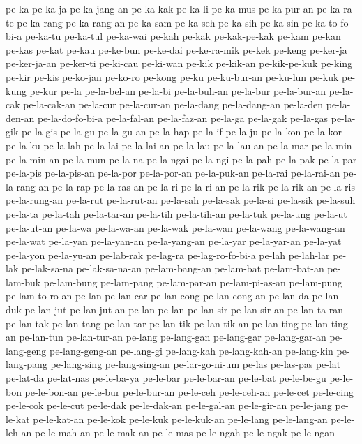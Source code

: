 {pe-ka pe-ka-ja pe-ka-jang-an pe-ka-kak pe-ka-li pe-ka-mus pe-ka-pur-an
pe-ka-ra-te pe-ka-rang pe-ka-rang-an pe-ka-sam pe-ka-seh pe-ka-sih
pe-ka-sin pe-ka-to-fo-bi-a pe-ka-tu pe-ka-tul pe-ka-wai pe-kah pe-kak
pe-kak-pe-kak pe-kam pe-kan pe-kas pe-kat pe-kau pe-ke-bun pe-ke-dai
pe-ke-ra-mik pe-kek pe-keng pe-ker-ja pe-ker-ja-an pe-ker-ti pe-ki-cau
pe-ki-wan pe-kik pe-kik-an pe-kik-pe-kuk pe-king pe-kir pe-kis pe-ko-jan
pe-ko-ro pe-kong pe-ku pe-ku-bur-an pe-ku-lun pe-kuk pe-kung pe-kur pe-la
pe-la-bel-an pe-la-bi pe-la-buh-an pe-la-bur pe-la-bur-an pe-la-cak
pe-la-cak-an pe-la-cur pe-la-cur-an pe-la-dang pe-la-dang-an pe-la-den
pe-la-den-an pe-la-do-fo-bi-a pe-la-fal-an pe-la-faz-an pe-la-ga pe-la-gak
pe-la-gas pe-la-gik pe-la-gis pe-la-gu pe-la-gu-an pe-la-hap pe-la-if
pe-la-ju pe-la-kon pe-la-kor pe-la-ku pe-la-lah pe-la-lai pe-la-lai-an
pe-la-lau pe-la-lau-an pe-la-mar pe-la-min pe-la-min-an pe-la-mun pe-la-na
pe-la-ngai pe-la-ngi pe-la-pah pe-la-pak pe-la-par pe-la-pis pe-la-pis-an
pe-la-por pe-la-por-an pe-la-puk-an pe-la-rai pe-la-rai-an pe-la-rang-an
pe-la-rap pe-la-ras-an pe-la-ri pe-la-ri-an pe-la-rik pe-la-rik-an
pe-la-ris pe-la-rung-an pe-la-rut pe-la-rut-an pe-la-sah pe-la-sak
pe-la-si pe-la-sik pe-la-suh pe-la-ta pe-la-tah pe-la-tar-an pe-la-tih
pe-la-tih-an pe-la-tuk pe-la-ung pe-la-ut pe-la-ut-an pe-la-wa pe-la-wa-an
pe-la-wak pe-la-wan pe-la-wang pe-la-wang-an pe-la-wat pe-la-yan
pe-la-yan-an pe-la-yang-an pe-la-yar pe-la-yar-an pe-la-yat pe-la-yon
pe-la-yu-an pe-lab-rak pe-lag-ra pe-lag-ro-fo-bi-a pe-lah pe-lah-lar
pe-lak pe-lak-sa-na pe-lak-sa-na-an pe-lam-bang-an pe-lam-bat
pe-lam-bat-an pe-lam-buk pe-lam-bung pe-lam-pang pe-lam-par-an
pe-lam-pi-as-an pe-lam-pung pe-lam-to-ro-an pe-lan pe-lan-car pe-lan-cong
pe-lan-cong-an pe-lan-da pe-lan-duk pe-lan-jut pe-lan-jut-an pe-lan-pe-lan
pe-lan-sir pe-lan-sir-an pe-lan-ta-ran pe-lan-tak pe-lan-tang pe-lan-tar
pe-lan-tik pe-lan-tik-an pe-lan-ting pe-lan-ting-an pe-lan-tun
pe-lan-tur-an pe-lang pe-lang-gan pe-lang-gar pe-lang-gar-an pe-lang-geng
pe-lang-geng-an pe-lang-gi pe-lang-kah pe-lang-kah-an pe-lang-kin
pe-lang-pang pe-lang-sing pe-lang-sing-an pe-lar-go-ni-um pe-las
pe-las-pas pe-lat pe-lat-da pe-lat-nas pe-le-ba-ya pe-le-bar pe-le-bar-an
pe-le-bat pe-le-be-gu pe-le-bon pe-le-bon-an pe-le-bur pe-le-bur-an
pe-le-ceh pe-le-ceh-an pe-le-cet pe-le-cing pe-le-cok pe-le-cut pe-le-dak
pe-le-dak-an pe-le-gal-an pe-le-gir-an pe-le-jang pe-le-kat pe-le-kat-an
pe-le-kok pe-le-kuk pe-le-kuk-an pe-le-lang pe-le-lang-an pe-le-leh-an
pe-le-mah-an pe-le-mak-an pe-le-mas pe-le-ngah pe-le-ngak pe-le-ngan
}

